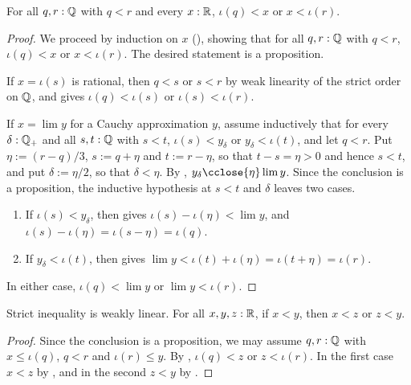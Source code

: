 \begin{lemma}
  \label{ltRatLtOrLtRatReal}
  For all $q, r : \mathbb{Q}$ with $q < r$ and every $x : \mathbb{R}$, $\iota(q) < x$ or $x < \iota(r)$.
\end{lemma}
\begin{proof}
  We proceed by induction on $x$ (), showing that for all $q, r : \mathbb{Q}$ with $q < r$, $\iota(q) < x$ or $x < \iota(r)$. The desired statement is a proposition.

  If $x = \iota(s)$ is rational, then $q < s$ or $s < r$ by weak linearity of the strict order on $\mathbb{Q}$, and  gives $\iota(q) < \iota(s)$ or $\iota(s) < \iota(r)$.

  If $x = \lim y$ for a Cauchy approximation $y$, assume inductively that for every $\delta : \mathbb{Q}_{+}$ and all $s, t : \mathbb{Q}$ with $s < t$, $\iota(s) < y_\delta$ or $y_\delta < \iota(t)$, and let $q < r$. Put $\eta := (r - q)/3$, $s := q + \eta$ and $t := r - \eta$, so that $t - s = \eta > 0$ and hence $s < t$, and put $\delta := \eta/2$, so that $\delta < \eta$. By , $y_\delta \cclose{\eta} \lim y$. Since the conclusion is a proposition, the inductive hypothesis at $s < t$ and $\delta$ leaves two cases.
  \begin{enumerate}
  \item If $\iota(s) < y_\delta$, then  gives $\iota(s) - \iota(\eta) < \lim y$, and $\iota(s) - \iota(\eta) = \iota(s - \eta) = \iota(q)$.
  \item If $y_\delta < \iota(t)$, then  gives $\lim y < \iota(t) + \iota(\eta) = \iota(t + \eta) = \iota(r)$.
  \end{enumerate}
  In either case, $\iota(q) < \lim y$ or $\lim y < \iota(r)$.
\end{proof}

\begin{lemma}
  \label{isWeaklyLinearLtReal}
  Strict inequality is weakly linear. For all $x, y, z : \mathbb{R}$, if $x < y$, then $x < z$ or $z < y$.
\end{lemma}
\begin{proof}
  Since the conclusion is a proposition, we may assume $q, r : \mathbb{Q}$ with $x \le \iota(q)$, $q < r$ and $\iota(r) \le y$. By , $\iota(q) < z$ or $z < \iota(r)$. In the first case $x < z$ by , and in the second $z < y$ by .
\end{proof}


